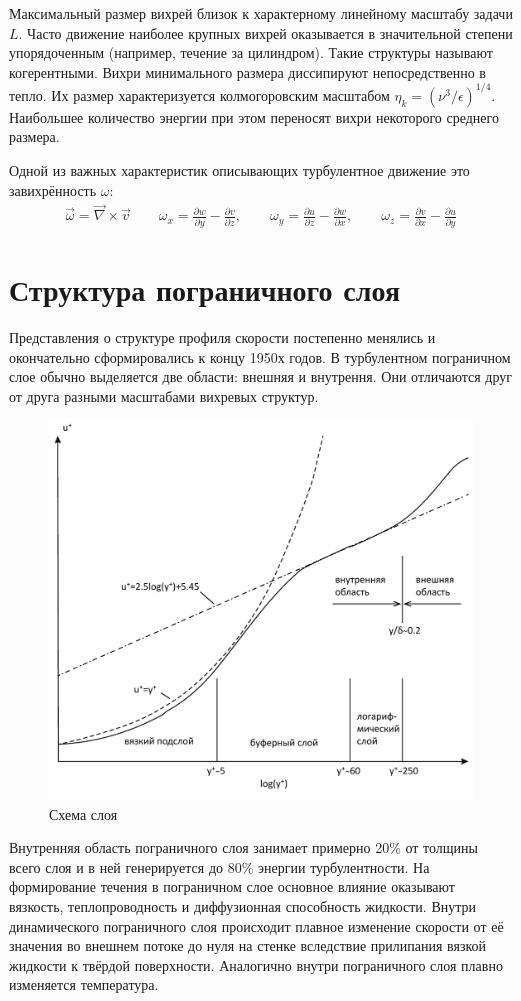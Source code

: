 	Максимальный размер вихрей близок к характерному линейному масштабу задачи $L$. Часто движение наиболее крупных вихрей оказывается в значительной степени упорядоченным (например, течение за цилиндром). Такие структуры называют когерентными. Вихри минимального размера диссипируют непосредственно в тепло. Их размер характеризуется колмогоровским масштабом $\eta_k = (\nu^3/\epsilon)^{1/4}$. Наибольшее количество энергии при этом переносят вихри некоторого среднего размера.
	
	Одной из важных характеристик описывающих турбулентное движение это завихрённость $\omega$: 
	\begin{align}
		\vec{\omega} = \vec{\nabla}\times \vec{v} \qquad \omega_x = \frac{\partial w}{\partial y} - \frac{\partial v}{\partial z}, \qquad \omega_y = \frac{\partial u}{\partial z} - \frac{\partial w}{\partial x}, \qquad \omega_z = \frac{\partial v}{\partial x} - \frac{\partial u}{\partial y}
	\end{align}

\section{Структура пограничного слоя}
	Представления о структуре профиля скорости постепенно менялись и окончательно сформировались к концу 1950х годов. В турбулентном пограничном слое обычно выделяется две области: внешняя и внутрення. Они отличаются друг от друга разными масштабами вихревых структур\cite{Белов2001}.
	\begin{figure}[H]
		\centering
		\includegraphics[width=0.6\linewidth]{../Assets/ПогранСлойRU}
		\caption{Схема слоя}
	\end{figure}
	Внутренняя область пограничного слоя занимает примерно 20\% от толщины всего слоя и в ней генерируется до 80\% энергии турбулентности. На формирование течения в пограничном слое основное влияние оказывают вязкость, теплопроводность и диффузионная способность жидкости. Внутри динамического пограничного слоя происходит плавное изменение скорости от её значения во внешнем потоке до нуля на стенке вследствие прилипания вязкой жидкости к твёрдой поверхности. Аналогично внутри пограничного слоя плавно изменяется температура.
			
